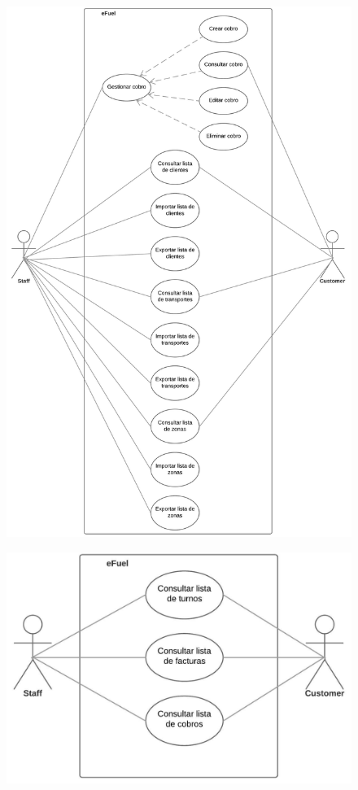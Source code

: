 \documentclass{article}
\begin{document}
    \begin{figure}[H]
        \includegraphics[width=\textwidth]{cu3.jpeg}
        \centering
    \end{figure}

    \begin{figure}[h]
        \includegraphics[width=\textwidth]{cu4.jpeg}
        \centering
    \end{figure}
\end{document}
